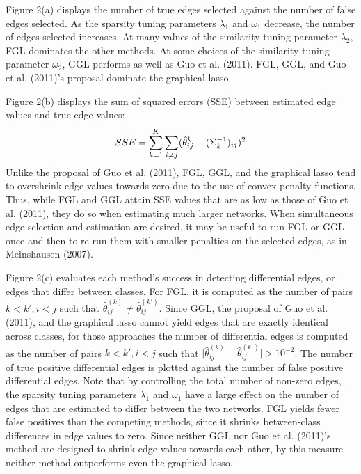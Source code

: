 \documentclass[12pt, leqno]{article}
\providecommand{\abs}[1]{\lvert#1\rvert}
\let\oldhat\hat
\renewcommand{\hat}[1]{\oldhat{{#1}}}
\def\s{\ensuremath\Sigma}
\begin{document}
Figure 2(a) displays the number of true edges selected against the
number of false edges selected. As the sparsity tuning parameters $\lambda_1$
and $\omega_1$ decrease, the number of edges selected increases. At many
values of the similarity tuning parameter $\lambda_2$, FGL dominates the other
methods. At some choices of the similarity tuning parameter $\omega_2$, GGL
performs as well as Guo et al. (2011). FGL, GGL, and Guo et
al. (2011)’s proposal dominate the graphical lasso.

Figure 2(b) displays the sum of squared errors (SSE) between estimated
edge values and true edge values:
\begin{align*}
SSE = \sum_{k=1}^K \sum_{i \not= j} (\hat{\theta}^k_{ij} - (\s^{-1}_k)_{ij})^2
\end{align*}
Unlike the proposal of Guo et al. (2011), FGL, GGL, and the graphical
lasso tend to overshrink edge values towards zero due to the use of
convex penalty functions. Thus, while FGL and GGL attain SSE values
that are as low as those of Guo et al. (2011), they do so when
estimating much larger networks. When simultaneous edge selection and
estimation are desired, it may be useful to run FGL or GGL once and
then to re-run them with smaller penalties on the selected edges, as
in Meinshausen (2007).

Figure 2(c) evaluates each method’s success in detecting differential
edges, or edges that differ between classes. For FGL, it is computed
as the number of pairs $k<k',i<j$ such that $\hat{\theta}^{(k)}_{ij}
\not= \hat{\theta}^{(k')}_{ij}$. 
Since GGL, the proposal of Guo et al. (2011), and the graphical lasso
cannot yield edges that are
exactly identical across classes, for those approaches the number of
differential edges is computed as the number of pairs $k<k',i<j$ such
that $\abs{\hat{\theta}^{(k)}_{ij}- \hat{\theta}^{(k')}_{ij}} >
10^{-2}$. The number of true positive differential edges is plotted
against the number of false positive differential edges. Note that by
controlling the total number of non-zero edges, the sparsity tuning
parameters $\lambda_1$ and $\omega_1$ have a large effect on the number of edges that
are estimated to differ between the two networks. FGL yields fewer
false positives than the competing methods, since it shrinks
between-class differences in edge values to zero. Since neither GGL
nor Guo et al. (2011)’s method are designed to shrink edge values
towards each other, by this measure neither method outperforms even
the graphical lasso.
\end{document}
